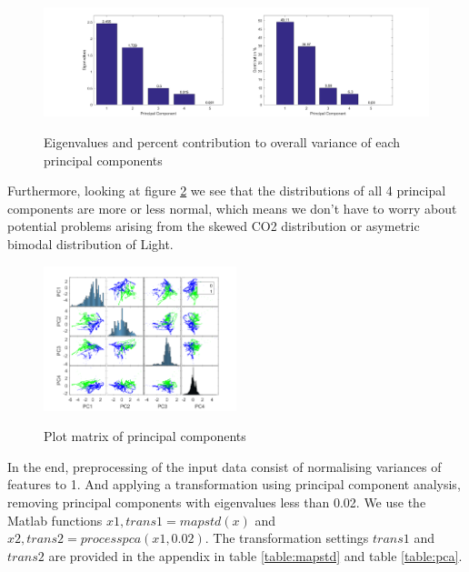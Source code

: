 \documentclass[a4paper, 11pt]{article}
\begin{document}
\begin{figure}[h]
  \caption{Eigenvalues and percent contribution to overall variance of each principal components}
  \centering
    \includegraphics[width=1\textwidth]{../figures/eigenvalues.png}
    \label{fig:eigenvalues}
\end{figure}

Furthermore, looking at figure \ref{fig:pca_plotmatrix} we see that the distributions of all 4 principal components are more or less normal, which means we don't have to worry about potential problems arising from the skewed CO2 distribution or asymetric bimodal distribution of Light. 

\begin{figure}[h]
  \caption{Plot matrix of principal components}
  \centering
    \includegraphics[width=0.5\textwidth]{../figures/pca_plotmatrix.png}
    \label{fig:pca_plotmatrix}
\end{figure}

In the end, preprocessing of the input data consist of normalising variances of features to 1. And applying a transformation using principal component analysis, removing principal components with eigenvalues less than 0.02. We use the Matlab functions $x1, trans1 = mapstd(x)$ and $x2, trans2 = processpca(x1, 0.02)$. The transformation settings $trans1$ and $trans2$ are provided in the appendix in table \ref{table:mapstd} and table \ref{table:pca}.
  
\end{document}
